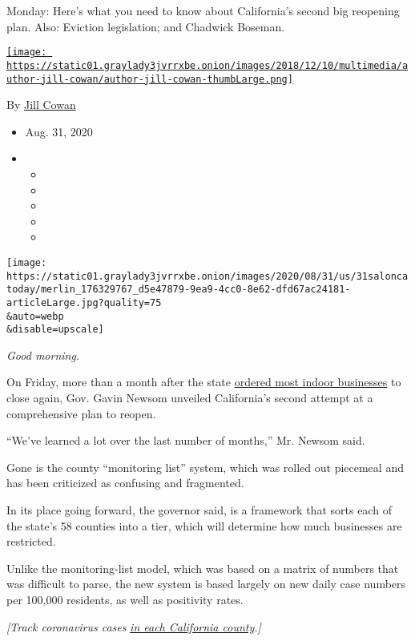 Monday: Here's what you need to know about California's second big
reopening plan. Also: Eviction legislation; and Chadwick Boseman.

\href{https://www.nytimes3xbfgragh.onion/by/jill-cowan}{\texttt{[image: https://static01.graylady3jvrrxbe.onion/images/2018/12/10/multimedia/author-jill-cowan/author-jill-cowan-thumbLarge.png]}}

By \href{https://www.nytimes3xbfgragh.onion/by/jill-cowan}{Jill Cowan}

\begin{itemize}
\item
  Aug. 31, 2020
\item
  \begin{itemize}
  \item
  \item
  \item
  \item
  \item
  \end{itemize}
\end{itemize}

\texttt{[image: https://static01.graylady3jvrrxbe.onion/images/2020/08/31/us/31saloncatoday/merlin\_176329767\_d5e47879-9ea9-4cc0-8e62-dfd67ac24181-articleLarge.jpg?quality=75\\\&auto=webp\\\&disable=upscale]}

\emph{Good morning.}

On Friday, more than a month after the state
\href{https://www.nytimes3xbfgragh.onion/2020/07/14/us/california-counties-reopening.html}{ordered
most indoor businesses} to close again, Gov. Gavin Newsom unveiled
California's second attempt at a comprehensive plan to reopen.

``We've learned a lot over the last number of months,'' Mr. Newsom said.

Gone is the county ``monitoring list'' system, which was rolled out
piecemeal and has been criticized as confusing and fragmented.

In its place going forward, the governor said, is a framework that sorts
each of the state's 58 counties into a tier, which will determine how
much businesses are restricted.

Unlike the monitoring-list model, which was based on a matrix of numbers
that was difficult to parse, the new system is based largely on new
daily case numbers per 100,000 residents, as well as positivity rates.

\emph{{[}Track coronavirus cases}
\href{https://www.nytimes3xbfgragh.onion/interactive/2020/us/california-coronavirus-cases.html\#cases}{\emph{in
each California county}}\emph{.{]}}

